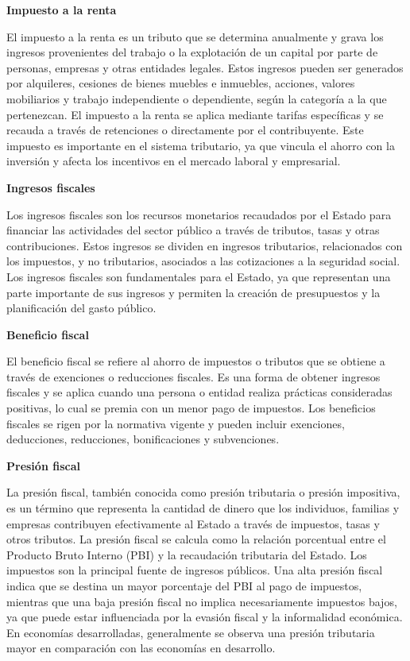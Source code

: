 \documentclass[
  letterpaper,
  DIV=11,
  numbers=noendperiod]{scrartcl}
\begin{document}
\textbf{Impuesto a la renta}

El impuesto a la renta es un tributo que se determina anualmente y grava
los ingresos provenientes del trabajo o la explotación de un capital por
parte de personas, empresas y otras entidades legales. Estos ingresos
pueden ser generados por alquileres, cesiones de bienes muebles e
inmuebles, acciones, valores mobiliarios y trabajo independiente o
dependiente, según la categoría a la que pertenezcan. El impuesto a la
renta se aplica mediante tarifas específicas y se recauda a través de
retenciones o directamente por el contribuyente. Este impuesto es
importante en el sistema tributario, ya que vincula el ahorro con la
inversión y afecta los incentivos en el mercado laboral y empresarial.

\textbf{Ingresos fiscales}

Los ingresos fiscales son los recursos monetarios recaudados por el
Estado para financiar las actividades del sector público a través de
tributos, tasas y otras contribuciones. Estos ingresos se dividen en
ingresos tributarios, relacionados con los impuestos, y no tributarios,
asociados a las cotizaciones a la seguridad social. Los ingresos
fiscales son fundamentales para el Estado, ya que representan una parte
importante de sus ingresos y permiten la creación de presupuestos y la
planificación del gasto público.

\textbf{Beneficio fiscal}

El beneficio fiscal se refiere al ahorro de impuestos o tributos que se
obtiene a través de exenciones o reducciones fiscales. Es una forma de
obtener ingresos fiscales y se aplica cuando una persona o entidad
realiza prácticas consideradas positivas, lo cual se premia con un menor
pago de impuestos. Los beneficios fiscales se rigen por la normativa
vigente y pueden incluir exenciones, deducciones, reducciones,
bonificaciones y subvenciones.

\textbf{Presión fiscal}

La presión fiscal, también conocida como presión tributaria o presión
impositiva, es un término que representa la cantidad de dinero que los
individuos, familias y empresas contribuyen efectivamente al Estado a
través de impuestos, tasas y otros tributos. La presión fiscal se
calcula como la relación porcentual entre el Producto Bruto Interno
(PBI) y la recaudación tributaria del Estado. Los impuestos son la
principal fuente de ingresos públicos. Una alta presión fiscal indica
que se destina un mayor porcentaje del PBI al pago de impuestos,
mientras que una baja presión fiscal no implica necesariamente impuestos
bajos, ya que puede estar influenciada por la evasión fiscal y la
informalidad económica. En economías desarrolladas, generalmente se
observa una presión tributaria mayor en comparación con las economías en
desarrollo.
\end{document}
